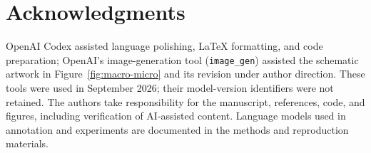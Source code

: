 \documentclass[fleqn,12pt,lineno]{wlpeerj}
\begin{document}
\section{Acknowledgments}
OpenAI Codex assisted language polishing, LaTeX formatting, and code preparation; OpenAI's image-generation tool (\texttt{image\_gen}) assisted the schematic artwork in Figure~\ref{fig:macro-micro} and its revision under author direction. These tools were used in September 2026; their model-version identifiers were not retained. The authors take responsibility for the manuscript, references, code, and figures, including verification of AI-assisted content. Language models used in annotation and experiments are documented in the methods and reproduction materials.


\begingroup
{}

\endgroup
\end{document}
